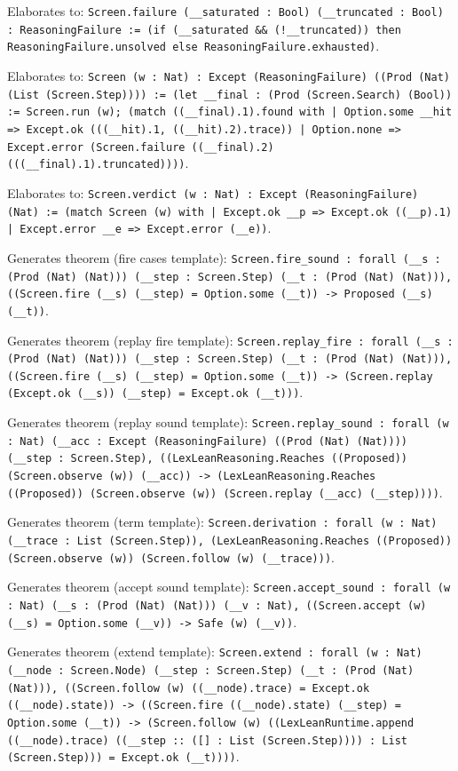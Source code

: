 \documentclass[11pt]{article}
\begin{document}
\noindent Elaborates to: \texttt{Screen.failure (\_\_saturated : Bool) (\_\_truncated : Bool) : ReasoningFailure := (if (\_\_saturated \&\& (!\_\_truncated)) then ReasoningFailure.unsolved else ReasoningFailure.exhausted)}.\par
\noindent Elaborates to: \texttt{Screen (w : Nat) : Except (ReasoningFailure) ((Prod (Nat) (List (Screen.Step)))) := (let \_\_final : (Prod (Screen.Search) (Bool)) := Screen.run (w); (match ((\_\_final).1).found with | Option.some \_\_hit => Except.ok (((\_\_hit).1, ((\_\_hit).2).trace)) | Option.none => Except.error (Screen.failure ((\_\_final).2) (((\_\_final).1).truncated))))}.\par
\noindent Elaborates to: \texttt{Screen.verdict (w : Nat) : Except (ReasoningFailure) (Nat) := (match Screen (w) with | Except.ok \_\_p => Except.ok ((\_\_p).1) | Except.error \_\_e => Except.error (\_\_e))}.\par
\noindent Generates theorem (fire cases template): \texttt{Screen.fire\_sound : forall (\_\_s : (Prod (Nat) (Nat))) (\_\_step : Screen.Step) (\_\_t : (Prod (Nat) (Nat))), ((Screen.fire (\_\_s) (\_\_step) = Option.some (\_\_t)) -> Proposed (\_\_s) (\_\_t))}.\par
\noindent Generates theorem (replay fire template): \texttt{Screen.replay\_fire : forall (\_\_s : (Prod (Nat) (Nat))) (\_\_step : Screen.Step) (\_\_t : (Prod (Nat) (Nat))), ((Screen.fire (\_\_s) (\_\_step) = Option.some (\_\_t)) -> (Screen.replay (Except.ok (\_\_s)) (\_\_step) = Except.ok (\_\_t)))}.\par
\noindent Generates theorem (replay sound template): \texttt{Screen.replay\_sound : forall (w : Nat) (\_\_acc : Except (ReasoningFailure) ((Prod (Nat) (Nat)))) (\_\_step : Screen.Step), ((LexLeanReasoning.Reaches ((Proposed)) (Screen.observe (w)) (\_\_acc)) -> (LexLeanReasoning.Reaches ((Proposed)) (Screen.observe (w)) (Screen.replay (\_\_acc) (\_\_step))))}.\par
\noindent Generates theorem (term template): \texttt{Screen.derivation : forall (w : Nat) (\_\_trace : List (Screen.Step)), (LexLeanReasoning.Reaches ((Proposed)) (Screen.observe (w)) (Screen.follow (w) (\_\_trace)))}.\par
\noindent Generates theorem (accept sound template): \texttt{Screen.accept\_sound : forall (w : Nat) (\_\_s : (Prod (Nat) (Nat))) (\_\_v : Nat), ((Screen.accept (w) (\_\_s) = Option.some (\_\_v)) -> Safe (w) (\_\_v))}.\par
\noindent Generates theorem (extend template): \texttt{Screen.extend : forall (w : Nat) (\_\_node : Screen.Node) (\_\_step : Screen.Step) (\_\_t : (Prod (Nat) (Nat))), ((Screen.follow (w) ((\_\_node).trace) = Except.ok ((\_\_node).state)) -> ((Screen.fire ((\_\_node).state) (\_\_step) = Option.some (\_\_t)) -> (Screen.follow (w) ((LexLeanRuntime.append ((\_\_node).trace) ((\_\_step :: ([] : List (Screen.Step)))) : List (Screen.Step))) = Except.ok (\_\_t))))}.\par
\end{document}
